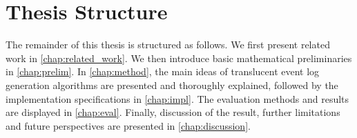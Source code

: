 \section{Thesis Structure}

The remainder of this thesis is structured as follows. We first present related work in \cref{chap:related_work}. We then introduce basic mathematical preliminaries in \cref{chap:prelim}. In \cref{chap:method}, the main ideas of translucent event log generation algorithms are presented and thoroughly explained, followed by the implementation specifications in \cref{chap:impl}. The evaluation methods and results are displayed in \cref{chap:eval}. Finally, discussion of the result, further limitations and future perspectives are presented in \cref{chap:discussion}. 
